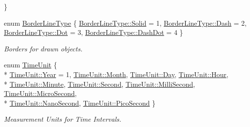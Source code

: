 \begin{DoxyCompactItemize}
 \}
\item 
enum \hyperlink{namespace_n_m_1_1_o_d_b_a0051eba4d616ecd0de959e3590185281}{Border\+Line\+Type} \{ \hyperlink{namespace_n_m_1_1_o_d_b_a0051eba4d616ecd0de959e3590185281ae41480b6bbfbf7407974a88d3d34f4fa}{Border\+Line\+Type\+::\+Solid} = 1, 
\hyperlink{namespace_n_m_1_1_o_d_b_a0051eba4d616ecd0de959e3590185281a3663598d5c5858b5a6040b1bbed4f187}{Border\+Line\+Type\+::\+Dash} = 2, 
\hyperlink{namespace_n_m_1_1_o_d_b_a0051eba4d616ecd0de959e3590185281aaf6c6cf7a454b4ef4a850ac4d960a2cc}{Border\+Line\+Type\+::\+Dot} = 3, 
\hyperlink{namespace_n_m_1_1_o_d_b_a0051eba4d616ecd0de959e3590185281aef1c598821948808c4dbd57821281a31}{Border\+Line\+Type\+::\+Dash\+Dot} = 4
 \}\begin{DoxyCompactList}\small\item\em Borders for drawn objects. \end{DoxyCompactList}
\item 
enum \hyperlink{namespace_n_m_1_1_o_d_b_abc8d78b50c080a27c6481599789409d1}{Time\+Unit} \{ \\*
\hyperlink{namespace_n_m_1_1_o_d_b_abc8d78b50c080a27c6481599789409d1a537c66b24ef5c83b7382cdc3f34885f2}{Time\+Unit\+::\+Year} = 1, 
\hyperlink{namespace_n_m_1_1_o_d_b_abc8d78b50c080a27c6481599789409d1a7cbb885aa1164b390a0bc050a64e1812}{Time\+Unit\+::\+Month}, 
\hyperlink{namespace_n_m_1_1_o_d_b_abc8d78b50c080a27c6481599789409d1a03727ac48595a24daed975559c944a44}{Time\+Unit\+::\+Day}, 
\hyperlink{namespace_n_m_1_1_o_d_b_abc8d78b50c080a27c6481599789409d1ab55e509c697e4cca0e1d160a7806698f}{Time\+Unit\+::\+Hour}, 
\\*
\hyperlink{namespace_n_m_1_1_o_d_b_abc8d78b50c080a27c6481599789409d1a62902641c38f3a4a8eb3212454360e24}{Time\+Unit\+::\+Minute}, 
\hyperlink{namespace_n_m_1_1_o_d_b_abc8d78b50c080a27c6481599789409d1ac22cf8376b1893dcfcef0649fe1a7d87}{Time\+Unit\+::\+Second}, 
\hyperlink{namespace_n_m_1_1_o_d_b_abc8d78b50c080a27c6481599789409d1a709eac30ac1d033b2175f2499ea0ae81}{Time\+Unit\+::\+Milli\+Second}, 
\hyperlink{namespace_n_m_1_1_o_d_b_abc8d78b50c080a27c6481599789409d1a298cf0d7bff35249758126269a6247bd}{Time\+Unit\+::\+Micro\+Second}, 
\\*
\hyperlink{namespace_n_m_1_1_o_d_b_abc8d78b50c080a27c6481599789409d1a104e648645e4368817a2cffaf340b014}{Time\+Unit\+::\+Nano\+Second}, 
\hyperlink{namespace_n_m_1_1_o_d_b_abc8d78b50c080a27c6481599789409d1a627cdccd0dd320d6d22faa5b1a7be331}{Time\+Unit\+::\+Pico\+Second}
 \}\begin{DoxyCompactList}\small\item\em Measurement Units for Time Intervals. \end{DoxyCompactList}

\end{DoxyCompactItemize}
